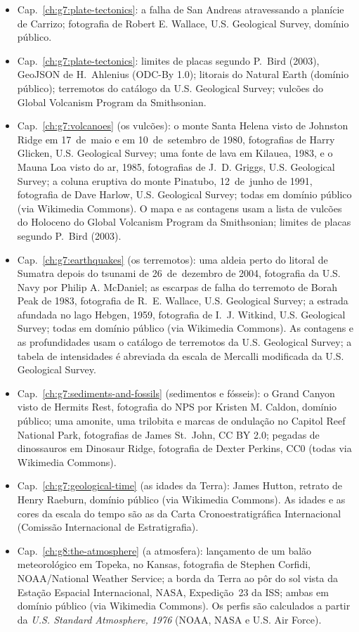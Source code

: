 \begin{itemize}
  \item Cap.~\ref{ch:g7:plate-tectonics}: a falha de San Andreas atravessando a planície de Carrizo; fotografia de Robert E. Wallace, U.S. Geological Survey, domínio público.
  \item Cap.~\ref{ch:g7:plate-tectonics}: limites de placas segundo P.~Bird (2003), GeoJSON de H.~Ahlenius (ODC-By 1.0); litorais do Natural Earth (domínio público); terremotos do catálogo da U.S. Geological Survey; vulcões do Global Volcanism Program da Smithsonian.
  \item Cap.~\ref{ch:g7:volcanoes} (os vulcões): o monte Santa Helena visto de Johnston Ridge em 17~de~maio e em 10~de~setembro de 1980, fotografias de Harry Glicken, U.S. Geological Survey; uma fonte de lava em Kilauea, 1983, e o Mauna Loa visto do ar, 1985, fotografias de J.~D. Griggs, U.S. Geological Survey; a coluna eruptiva do monte Pinatubo, 12~de~junho de 1991, fotografia de Dave Harlow, U.S. Geological Survey; todas em domínio público (via Wikimedia Commons). O mapa e as contagens usam a lista de vulcões do Holoceno do Global Volcanism Program da Smithsonian; limites de placas segundo P.~Bird (2003).
  \item Cap.~\ref{ch:g7:earthquakes} (os terremotos): uma aldeia perto do litoral de Sumatra depois do tsunami de 26~de~dezembro de 2004, fotografia da U.S. Navy por Philip A. McDaniel; as escarpas de falha do terremoto de Borah Peak de 1983, fotografia de R.~E. Wallace, U.S. Geological Survey; a estrada afundada no lago Hebgen, 1959, fotografia de I.~J. Witkind, U.S. Geological Survey; todas em domínio público (via Wikimedia Commons). As contagens e as profundidades usam o catálogo de terremotos da U.S. Geological Survey; a tabela de intensidades é abreviada da escala de Mercalli modificada da U.S. Geological Survey.
  \item Cap.~\ref{ch:g7:sediments-and-fossils} (sedimentos e fósseis): o Grand Canyon visto de Hermits Rest, fotografia do NPS por Kristen M. Caldon, domínio público; uma amonite, uma trilobita e marcas de ondulação no Capitol Reef National Park, fotografias de James St.~John, CC BY 2.0; pegadas de dinossauros em Dinosaur Ridge, fotografia de Dexter Perkins, CC0 (todas via Wikimedia Commons).
  \item Cap.~\ref{ch:g7:geological-time} (as idades da Terra): James Hutton, retrato de Henry Raeburn, domínio público (via Wikimedia Commons). As idades e as cores da escala do tempo são as da Carta Cronoestratigráfica Internacional (Comissão Internacional de Estratigrafia).
  \item Cap.~\ref{ch:g8:the-atmosphere} (a atmosfera): lançamento de um balão meteorológico em Topeka, no Kansas, fotografia de Stephen Corfidi, NOAA/National Weather Service; a borda da Terra ao pôr do sol vista da Estação Espacial Internacional, NASA, Expedição~23 da ISS; ambas em domínio público (via Wikimedia Commons). Os perfis são calculados a partir da \emph{U.S. Standard Atmosphere, 1976} (NOAA, NASA e U.S. Air Force).

\end{itemize}
